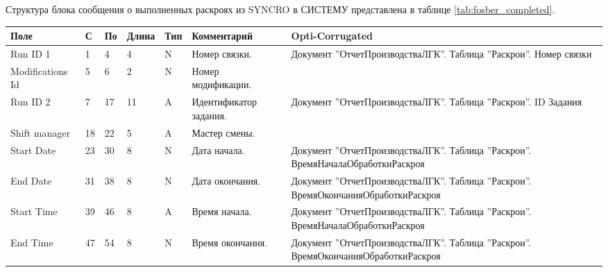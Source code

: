 
\scriptsize
\begin{landscape}
Структура блока сообщения о выполненных раскроях из SYNCRO в СИСТЕМУ представлена в таблице \ref{tab:fosber_completed}.
\scriptsize

\begin{longtable}{|p{45mm}|p{6mm}|p{6mm}|p{8mm}|p{6mm}|p{70mm}|p{80mm}|}
\hline
\parbox[c][10mm]{45mm}{\centering Поле} & \parbox{6mm}{\centering С} & \parbox{6mm}{\centering По} & \parbox{8mm}{\centering Длина} & \parbox{5mm}{\centering Тип} & \parbox{70mm}{\centering Комментарий}  & \parbox{80mm}{\centering Opti-Corrugated} \\
\hline
\parbox[c][10mm]{45mm}{Run ID 1} & \parbox{9mm}{1} & \parbox{9mm}{4} & \parbox{11mm}{4} & \parbox{10mm}{N} & \parbox{70mm}{Номер связки.} & \parbox{80mm}{Документ ''ОтчетПроизводстваЛГК''. Таблица ''Раскрои''. Номер связки} \\
\hline
\parbox[c][10mm]{45mm}{Modifications Id} & \parbox{9mm}{5} & \parbox{9mm}{6} & \parbox{11mm}{2} & \parbox{10mm}{N} & \parbox{70mm}{Номер модификации.} & \parbox{80mm}{} \\
\hline
\parbox[c][10mm]{45mm}{Run ID 2} & \parbox{9mm}{7} & \parbox{9mm}{17} & \parbox{11mm}{11} & \parbox{10mm}{A} & \parbox{70mm}{Идентификатор задания.} & \parbox{80mm}{Документ ''ОтчетПроизводстваЛГК''. Таблица ''Раскрои''. ID Задания} \\
\hline
\parbox[c][10mm]{45mm}{Shift manager} & \parbox{9mm}{18} & \parbox{9mm}{22} & \parbox{11mm}{5} & \parbox{10mm}{A} & \parbox{70mm}{Мастер смены.} & \parbox{80mm}{} \\
\hline
\parbox[c][10mm]{45mm}{Start Date} & \parbox{9mm}{23} & \parbox{9mm}{30} & \parbox{11mm}{8} & \parbox{10mm}{N} & \parbox{70mm}{Дата начала.} & \parbox{80mm}{Документ ''ОтчетПроизводстваЛГК''. Таблица ''Раскрои''. ВремяНачалаОбработкиРаскроя} \\
\hline
\parbox[c][10mm]{45mm}{End Date} & \parbox{9mm}{31} & \parbox{9mm}{38} & \parbox{11mm}{8} & \parbox{10mm}{N} & \parbox{70mm}{Дата окончания.} & \parbox{80mm}{Документ ''ОтчетПроизводстваЛГК''. Таблица ''Раскрои''. ВремяОкончанияОбработкиРаскроя} \\
\hline
\parbox[c][10mm]{45mm}{Start Time} & \parbox{9mm}{39} & \parbox{9mm}{46} & \parbox{11mm}{8} & \parbox{10mm}{A} & \parbox{70mm}{Время начала.} & \parbox{80mm}{Документ ''ОтчетПроизводстваЛГК''. Таблица ''Раскрои''. ВремяНачалаОбработкиРаскроя} \\
\hline
\parbox[c][10mm]{45mm}{End Time} & \parbox{9mm}{47} & \parbox{9mm}{54} & \parbox{11mm}{8} & \parbox{10mm}{N} & \parbox{70mm}{Время окончания.} & \parbox{80mm}{Документ ''ОтчетПроизводстваЛГК''. Таблица ''Раскрои''. ВремяОкончанияОбработкиРаскроя} \\

\end{longtable}
\end{landscape}
